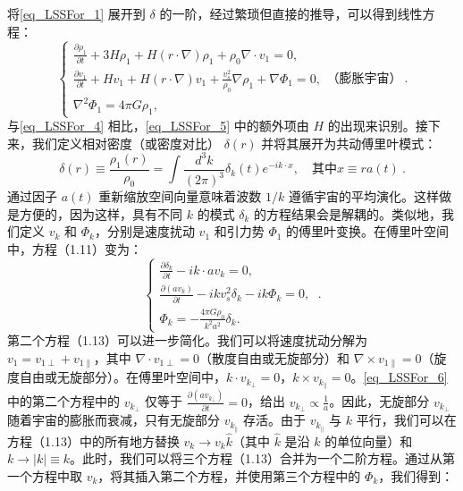 将\autoref{eq_LSSFor_1} 展开到 \( \delta \) 的一阶，经过繁琐但直接的推导，可以得到线性方程：
\begin{equation}\label{eq_LSSFor_5}\begin{cases} 
\frac{\partial \rho_1}{\partial t} + 3H\rho_1 + H(r \cdot \nabla)\rho_1 + \rho_0\nabla \cdot v_1 = 0, \\
\frac{\partial v_1}{\partial t} + Hv_1 + H(r \cdot \nabla)v_1 + \frac{v_s^2}{\rho_0}\nabla\rho_1 + \nabla\Phi_1 = 0, \\
\nabla^2\Phi_1 = 4\pi G\rho_1,
\end{cases} \text{（膨胀宇宙）} ~.
\end{equation}
与\autoref{eq_LSSFor_4} 相比，\autoref{eq_LSSFor_5} 中的额外项由 $H$ 的出现来识别。接下来，我们定义相对密度（或密度对比） \( \delta(r) \) 并将其展开为共动傅里叶模式：
\[ \delta(r) \equiv \frac{\rho_1(r)}{\rho_0} = \int \frac{d^3k}{(2\pi)^3} \delta_k(t) e^{-ik \cdot x}, \quad \text{其中} x \equiv r a(t)~. \]
通过因子 \( a(t) \) 重新缩放空间向量意味着波数 \( 1/k \) 遵循宇宙的平均演化。这样做是方便的，因为这样，具有不同 \( k \) 的模式 \( \delta_k \) 的方程结果会是解耦的。类似地，我们定义 \( v_k \) 和 \( \Phi_k \)，分别是速度扰动 \( v_1 \) 和引力势 \( \Phi_1 \) 的傅里叶变换。在傅里叶空间中，方程（1.11）变为：
\begin{equation}\label{eq_LSSFor_6} \begin{cases} 
\frac{\partial \delta_k}{\partial t} - ik \cdot a v_k = 0, \\
\frac{\partial (a v_k)}{\partial t} - ik v_s^2 \delta_k - ik \Phi_k = 0, \\
\Phi_k = -\frac{4\pi G \rho_0}{k^2 a^2} \delta_k.
\end{cases} ~.
\end{equation}
第二个方程（1.13）可以进一步简化。我们可以将速度扰动分解为 \( v_1 = v_{1\perp} + v_{1\parallel} \)，其中 \( \nabla \cdot v_{1\perp} = 0 \)（散度自由或无旋部分）和 \( \nabla \times v_{1\parallel} = 0 \)（旋度自由或无旋部分）。在傅里叶空间中，\( k \cdot v_{k_\perp} = 0 \)，\( k \times v_{k_\parallel} = 0 \)。\autoref{eq_LSSFor_6} 中的第二个方程中的 \( v_{k_\perp} \) 仅等于 \( \frac{\partial (a v_{k_\perp})}{\partial t} = 0 \)，给出 \( v_{k_\perp} \propto \frac{1}{a} \)。因此，无旋部分 \( v_{k_\perp} \) 随着宇宙的膨胀而衰减，只有无旋部分 \( v_{k_\parallel} \) 存活。由于 \( v_{k_\parallel} \) 与 \( k \) 平行，我们可以在方程（1.13）中的所有地方替换 \( v_k \rightarrow v_k \hat{k} \)（其中 \( \hat{k} \) 是沿 \( k \) 的单位向量）和 \( k \rightarrow |k| \equiv k \)。此时，我们可以将三个方程（1.13）合并为一个二阶方程。通过从第一个方程中取 \( v_k \)，将其插入第二个方程，并使用第三个方程中的 \( \Phi_k \)，我们得到：
